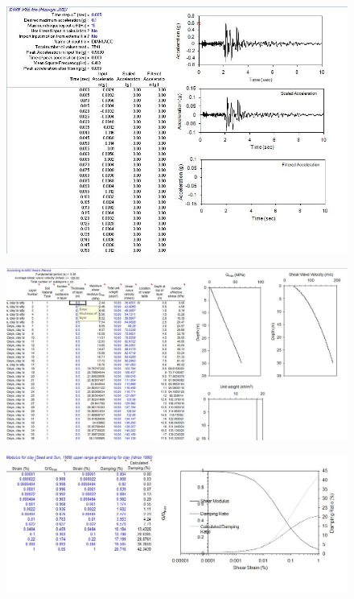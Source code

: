 \documentclass[12pt,a4paper]{report}
\begin{document}
\begin{figure}[h!]
	\centering
	\includegraphics[width=1.2\linewidth]{"NERA_RES"}
	\label{Ner1}
\end{figure} 

\begin{figure}[h!]
	\centering
	\includegraphics[width=1\linewidth]{"NERA_RES2"}
	\label{Ner2}
\end{figure}

\begin{figure}[h!]
	\centering
	\includegraphics[width=1\linewidth]{"NERA_RES3"}
	\label{Ner3}
\end{figure}




\end{document}
